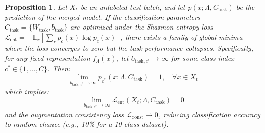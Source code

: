 \documentclass{article}
\theoremstyle{plain}
\newtheorem{proposition}[theorem]{Proposition}
\theoremstyle{definition}
\theoremstyle{remark}
\begin{document}
\begin{proposition}
\label{prop:collapse}
Let $X_t$ be an unlabeled test batch, and let $p(x; \Lambda, C_{\text{task}})$ be the prediction of the merged model. If the classification parameters $C_{\text{task}} = \{W_{\text{task}}, b_{\text{task}}\}$ are optimized under the Shannon entropy loss $\mathcal{L}_{\text{ent}} = -\mathbb{E}_x [ \sum_c p_c(x) \log p_c(x) ]$, there exists a family of global minima where the loss converges to zero but the task performance collapses. Specifically, for any fixed representation $f_{\Lambda}(x)$, let $b_{\text{task}, c^*} \to \infty$ for some class index $c^* \in \{1,\dots,C\}$. Then:
\begin{equation}
    \lim_{b_{\text{task}, c^*} \to \infty} p_{c^*}(x; \Lambda, C_{\text{task}}) = 1, \quad \forall x \in X_t
\end{equation}
which implies:
\begin{equation}
    \lim_{b_{\text{task}, c^*} \to \infty} \mathcal{L}_{\text{ent}}(X_t; \Lambda, C_{\text{task}}) = 0
\end{equation}
and the augmentation consistency loss $\mathcal{L}_{\text{const}} \to 0$, reducing classification accuracy to random chance (e.g., 10\% for a 10-class dataset).
\end{proposition}
\end{document}
